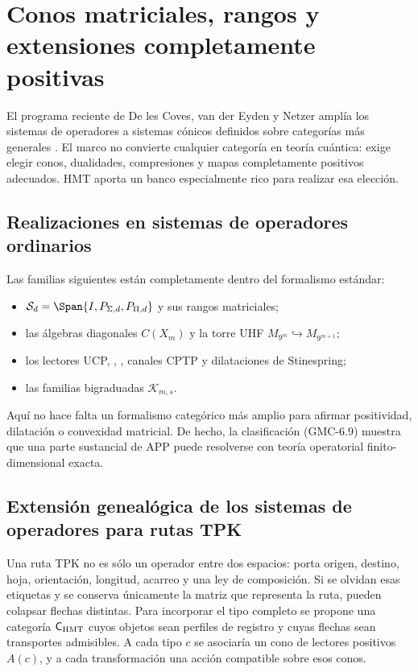 \section{Conos matriciales, rangos y extensiones completamente positivas}
\label{p12-83-c22-s5:gmc:chap:beyond}

El programa reciente de De les Coves, van der Eyden y Netzer amplía los
sistemas de operadores a sistemas cónicos definidos sobre categorías más
generales \citep{delescoves2026beyond}. El marco no convierte cualquier
categoría en teoría cuántica: exige elegir conos, dualidades, compresiones y
mapas completamente positivos adecuados. HMT aporta un banco especialmente
rico para realizar esa elección.

\subsection{Realizaciones en sistemas de operadores ordinarios}

Las familias siguientes están completamente dentro del formalismo estándar:

\begin{itemize}
 \item $\mathcal S_d=\Span\{I,P_{\Sigma,d},P_{\Pi,d}\}$ y sus rangos
 matriciales;
 \item las álgebras diagonales $C(X_m)$ y la torre UHF
 $M_{9^m}\hookrightarrow M_{9^{m+1}}$;
 \item los lectores UCP, \POVM, \PVM, canales CPTP y dilataciones de
 Stinespring;
 \item las familias bigraduadas $\mathcal K_{m,s}$.
\end{itemize}

Aquí no hace falta un formalismo categórico más amplio para afirmar
positividad, dilatación o convexidad matricial. De hecho, la clasificación
\textup{(GMC-6.9)} muestra que una parte sustancial de APP puede resolverse con
teoría operatorial finito-dimensional exacta.

\subsection{Extensión genealógica de los sistemas de operadores para rutas TPK}

Una ruta TPK no es sólo un operador entre dos espacios: porta origen, destino,
hoja, orientación, longitud, acarreo y una ley de composición. Si se olvidan
esas etiquetas y se conserva únicamente la matriz que representa la ruta,
pueden colapsar flechas distintas. Para incorporar el tipo completo se propone
una categoría $\mathsf C_{\rm HMT}$ cuyos objetos sean perfiles de registro y
cuyas flechas sean transportes admisibles. A cada tipo $c$ se asociaría un
cono de lectores positivos $A(c)$, y a cada transformación una acción
compatible sobre esos conos.

